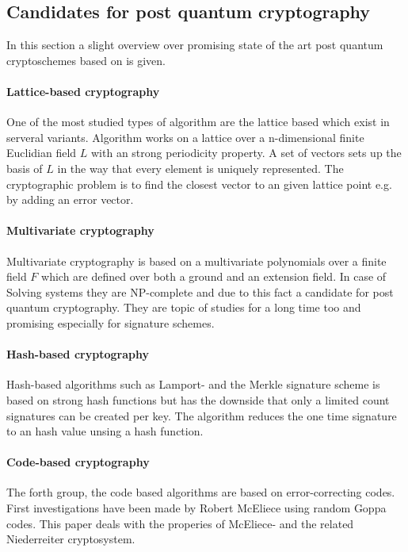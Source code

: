 \subsection{Candidates for post quantum cryptography}
\label{pqalgcand}
In this section a slight overview over promising state of the art post quantum cryptoschemes based on \cite{bernstein2009introduction} is given. 
\paragraph*{Lattice-based cryptography}
One of the most studied types of algorithm are the lattice based which exist in serveral variants. Algorithm works on a lattice over a n-dimensional finite Euclidian field $L$ with an strong periodicity property. A set of vectors sets up the basis of $L$ in the way that every element is uniquely represented. The cryptographic problem is to find the closest vector to an given lattice point e.g. by adding an error vector\cite{bernstein2009introduction}\cite{wiki:lattice}.
\paragraph*{Multivariate cryptography}
Multivariate cryptography is based on a multivariate polynomials over a finite field $F$ which are defined over both a ground and an extension field. In case of Solving systems they are NP-complete and due to this fact a candidate for post quantum cryptography. They are topic of studies for a long time too and promising especially for signature schemes\cite{bernstein2009introduction}\cite{wiki:multi}.

\paragraph*{Hash-based cryptography}
Hash-based algorithms such as Lamport-\cite{wiki:lamportsig} and the Merkle\cite{wiki:merklesig} signature scheme is based on strong hash functions but has the downside that only a limited count signatures can be created per key. The algorithm reduces the one time signature to an hash value unsing a hash function\cite{bernstein2009introduction}.

\paragraph*{Code-based cryptography}
The forth group, the code based algorithms are based on error-correcting codes. First investigations have been made by Robert McEliece using random Goppa codes\cite{wiki:bingoppa}. This paper deals with the properies of McEliece- and the related Niederreiter cryptosystem\cite{bernstein2009introduction}\cite{wiki:niederreither}.

